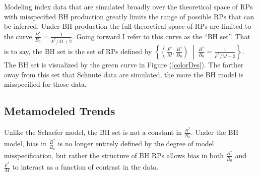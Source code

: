 %
Modeling index data that are simulated broadly over the theoretical space of RPs
with misspecified BH production greatly limits the range of possible RPs that
can be inferred. Under BH production the full theoretical space of RPs are
limited to the curve \mbox{$\frac{B^*}{B_0}=\frac{1}{F^*/M+2}$.} Going forward I refer to 
this curve as the ``BH set''. That is to say, the BH set is the set of RPs defined by
$\left\{\left(\frac{F^*}{M}, \frac{B^*}{B_0}\right) \;\middle|\; \frac{B^*}{B_0}=\frac{1}{F^*/M+2}\right\}$. 
The BH set is visualized by the green curve in Figure (\ref{colorDes}).
The farther away from this set that Schnute data are simulated, the more the
BH model is misspecified for those data.

%
\subsection{Metamodeled Trends \label{sMeta}}

%
Unlike the Schaefer model, the BH set is not a constant in
$\frac{B^*}{B_0}$. Under the BH model, bias in $\frac{B^*}{B_0}$ is no
longer entirely defined by the degree of model misspecification, but rather the
structure of BH RPs allows bias in both $\frac{B^*}{B_0}$ and $\frac{F^*}{M}$
to interact as a function of contrast in the data.

